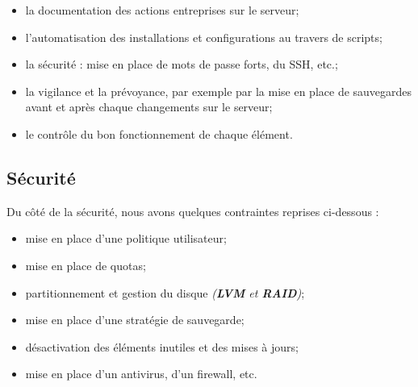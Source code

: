 \begin{itemize}
    \item la documentation des actions entreprises sur le serveur;
    \item l'automatisation des installations et configurations au travers de scripts;
    \item la sécurité : mise en place de mots de passe forts, du SSH, etc.;
    \item la vigilance et la prévoyance, par exemple par la mise en place de
    sauvegardes avant et après chaque changements sur le serveur;
    \item le contrôle du bon fonctionnement de chaque élément.
\end{itemize}


\subsection{Sécurité}
\label{subsec:securite}

Du côté de la sécurité, nous avons quelques contraintes reprises ci-dessous :

\begin{itemize}
    \item mise en place d'une politique utilisateur;
    \item mise en place de quotas;
    \item partitionnement et gestion du disque \textit{(\textbf{LVM} et
    \textbf{RAID})};
    \item mise en place d'une stratégie de sauvegarde;
    \item désactivation des éléments inutiles et des mises à jours;
    \item mise en place d'un antivirus, d'un firewall, etc.
\end{itemize}


